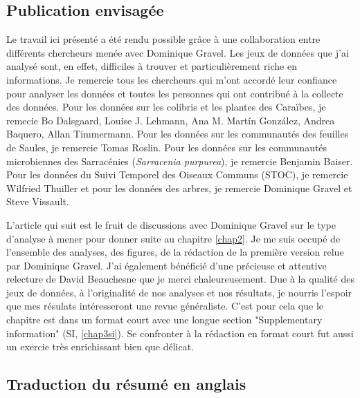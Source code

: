 \subsection{Publication envisagée}

Le travail ici présenté a été rendu possible grâce à une collaboration entre différents
chercheurs menée avec Dominique Gravel. Les jeux de données que j'ai analysé
sont, en effet, difficiles à trouver et particulièrement riche en informations.
Je remercie tous les chercheurs qui m'ont accordé leur confiance
pour analyser les données et toutes les personnes qui ont contribué à la collecte
des données. Pour les données sur les colibris et les plantes des Caraïbes,
je remecie Bo Dalsgaard, Louise J. Lehmann, Ana M. Martín González,
Andrea Baquero, Allan Timmermann. Pour les données sur les communautés des feuilles de Saules,
je remercie Tomas Roslin. Pour les données sur les communautés microbiennes des
Sarracénies (\emph{Sarracenia purpurea}), je remercie Benjamin Baiser.
Pour les données du Suivi Temporel des Oiseaux Communs (STOC), je remercie Wilfried Thuiller
et pour les données des arbres, je remercie Dominique Gravel et Steve Vissault.

L'article qui suit est le fruit de discussions avec Dominique Gravel sur le type
d'analyse à mener pour donner suite au chapitre \ref{chap2}. Je me suis occupé
de l'ensemble des analyses, des figures, de la rédaction de la première version
relue par Dominique Gravel. J'ai également bénéficié d'une précieuse et
attentive relecture de David Beauchesne que je merci chaleureusement.
Due à la qualité des jeux de données, à l'originalité de nos analyses et
nos résultats, je nourris l'espoir que mes résulats intéresseront
une revue généraliste. C'est pour cela que le chapitre est dans un format court avec une
longue section "Supplementary information" (SI, \ref{chap3si}). Se confronter
à la rédaction en format court fut aussi un exercie très enrichissant bien que délicat.




\subsection{Traduction du résumé en anglais}

